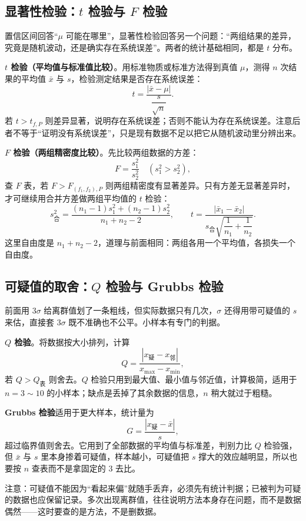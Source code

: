 \documentclass[UTF8]{ctexbook}
\begin{document}
\subsection{显著性检验：$t$ 检验与 $F$ 检验}

置信区间回答“$\mu$ 可能在哪里”，显著性检验回答另一个问题：“两组结果的差异，究竟是随机波动，还是确实存在系统误差”。两者的统计基础相同，都是 $t$ 分布。

\textbf{$t$ 检验（平均值与标准值比较）}。用标准物质或标准方法得到真值 $\mu$，测得 $n$ 次结果的平均值 $\bar{x}$ 与 $s$，检验测定结果是否存在系统误差：
\[
t=\frac{|\bar{x}-\mu|}{\dfrac{s}{\sqrt{n}}}.
\]
若 $t>t_{f,P}$ 则差异显著，说明存在系统误差；否则不能认为存在系统误差。注意后者不等于“证明没有系统误差”，只是现有数据不足以把它从随机波动里分辨出来。

\textbf{$F$ 检验（两组精密度比较）}。先比较两组数据的方差：
\[
F=\frac{s_1^2}{s_2^2}\quad(s_1^2>s_2^2),
\]
查 $F$ 表，若 $F>F_{(f_1,f_2),P}$ 则两组精密度有显著差异。只有方差无显著差异时，才可继续用合并方差做两组平均值的 $t$ 检验：
\[
s_{\text{合}}^2=\frac{(n_1-1)s_1^2+(n_2-1)s_2^2}{n_1+n_2-2},
\qquad
t=\frac{|\bar{x}_1-\bar{x}_2|}{s_{\text{合}}\sqrt{\dfrac{1}{n_1}+\dfrac{1}{n_2}}}.
\]
这里自由度是 $n_1+n_2-2$，道理与前面相同：两组各用一个平均值，各损失一个自由度。

\subsection{可疑值的取舍：$Q$ 检验与 Grubbs 检验}

前面用 $3\sigma$ 给离群值划了一条粗线，但实际数据只有几次，$\sigma$ 还得用带可疑值的 $s$ 来估，直接套 $3\sigma$ 既不准确也不公平。小样本有专门的判据。

\textbf{$Q$ 检验}。将数据按大小排列，计算
\[
Q=\frac{|x_{\text{疑}}-x_{\text{邻}}|}{x_{\max}-x_{\min}},
\]
若 $Q>Q_{\text{表}}$ 则舍去。$Q$ 检验只用到最大值、最小值与邻近值，计算极简，适用于 $n=3\sim10$ 的小样本；缺点是丢掉了其余数据的信息，$n$ 稍大就过于粗糙。

\textbf{Grubbs 检验}适用于更大样本，统计量为
\[
G=\frac{|x_{\text{疑}}-\bar{x}|}{s},
\]
超过临界值则舍去。它用到了全部数据的平均值与标准差，判别力比 $Q$ 检验强，但 $\bar{x}$ 与 $s$ 里本身掺着可疑值，样本越小，可疑值把 $s$ 撑大的效应越明显，所以也要按 $n$ 查表而不是拿固定的 $3$ 去比。

注意：可疑值不能因为“看起来偏”就随手丢弃，必须先有统计判据；已被判为可疑的数据也应保留记录。多次出现离群值，往往说明方法本身存在问题，而不是数据偶然——这时要查的是方法，不是删数据。
\end{document}

